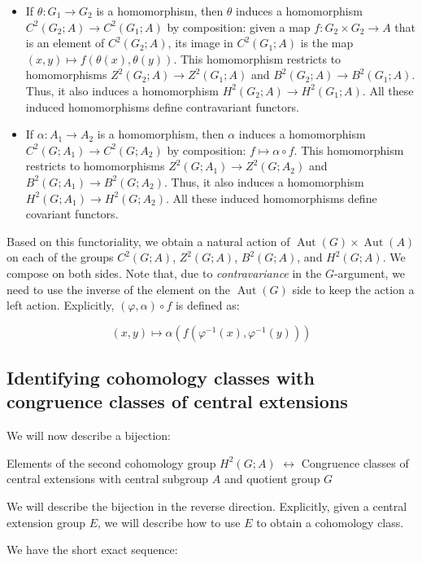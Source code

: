 \begin{itemize}
\item If $\theta:G_1 \to G_2$ is a homomorphism, then $\theta$ induces
  a homomorphism $C^2(G_2;A) \to C^2(G_1;A)$ by composition: given a
  map $f:G_2 \times G_2 \to A$ that is an element of $C^2(G_2;A)$, its
  image in $C^2(G_1;A)$ is the map $(x,y) \mapsto
  f(\theta(x),\theta(y))$. This homomorphism restricts to
  homomorphisms $Z^2(G_2;A) \to Z^2(G_1;A)$ and $B^2(G_2;A) \to
  B^2(G_1;A)$. Thus, it also induces a homomorphism $H^2(G_2;A) \to
  H^2(G_1;A)$. All these induced homomorphisms define contravariant
  functors.
\item If $\alpha:A_1 \to A_2$ is a homomorphism, then $\alpha$ induces
  a homomorphism $C^2(G;A_1) \to C^2(G;A_2)$ by composition: $f
  \mapsto \alpha \circ f$. This homomorphism restricts to
  homomorphisms $Z^2(G;A_1) \to Z^2(G;A_2)$ and $B^2(G;A_1) \to
  B^2(G;A_2)$. Thus, it also induces a homomorphism $H^2(G;A_1) \to
  H^2(G;A_2)$. All these induced homomorphisms define covariant
  functors.
\end{itemize}

Based on this functoriality, we obtain a natural action of
$\operatorname{Aut}(G) \times \operatorname{Aut}(A)$ on each of the
groups $C^2(G;A)$, $Z^2(G;A)$, $B^2(G;A)$, and $H^2(G;A)$. We compose
on both sides. Note that, due to {\em contravariance} in the
$G$-argument, we need to use the inverse of the element on the
$\operatorname{Aut}(G)$ side to keep the action a left
action. Explicitly, $(\varphi,\alpha) \circ f$ is defined as:

$$(x,y) \mapsto \alpha(f(\varphi^{-1}(x),\varphi^{-1}(y)))$$

\subsection{Identifying cohomology classes with congruence classes of central extensions}\label{sec:explicit-cocycle-description-of-extension}

We will now describe a bijection:

Elements of the second cohomology group $H^2(G;A)$ $\leftrightarrow$
Congruence classes of central extensions with central subgroup $A$ and
quotient group $G$

We will describe the bijection in the reverse direction. Explicitly,
given a central extension group $E$, we will describe how to use $E$
to obtain a cohomology class.

We have the short exact sequence:

